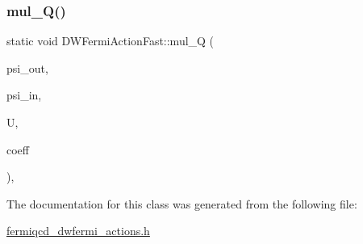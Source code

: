 \subsubsection{\texorpdfstring{mul\+\_\+\+Q()}{mul\_Q()}}
{\footnotesize\ttfamily static void D\+W\+Fermi\+Action\+Fast\+::mul\+\_\+Q (\begin{DoxyParamCaption}\item[{\hyperlink{classdwfermi__field}{dwfermi\+\_\+field} \&}]{psi\+\_\+out,  }\item[{\hyperlink{classdwfermi__field}{dwfermi\+\_\+field} \&}]{psi\+\_\+in,  }\item[{\hyperlink{classgauge__field}{gauge\+\_\+field} \&}]{U,  }\item[{\hyperlink{classcoefficients}{coefficients} \&}]{coeff }\end{DoxyParamCaption})\hspace{0.3cm}{\ttfamily [inline]}, {\ttfamily [static]}}



The documentation for this class was generated from the following file\+:\begin{DoxyCompactItemize}
\item 
\hyperlink{fermiqcd__dwfermi__actions_8h}{fermiqcd\+\_\+dwfermi\+\_\+actions.\+h}\end{DoxyCompactItemize}
